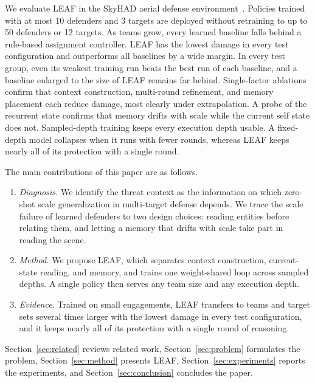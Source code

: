 We evaluate LEAF in the SkyHAD aerial defense environment~\cite{skyhad2026}. Policies trained with at most 10 defenders and 3 targets are deployed without retraining to up to 50 defenders or 12 targets. As teams grow, every learned baseline falls behind a rule-based assignment controller. LEAF has the lowest damage in every test configuration and outperforms all baselines by a wide margin. In every test group, even its weakest training run beats the best run of each baseline, and a baseline enlarged to the size of LEAF remains far behind. Single-factor ablations confirm that context construction, multi-round refinement, and memory placement each reduce damage, most clearly under extrapolation. A probe of the recurrent state confirms that memory drifts with scale while the current self state does not. Sampled-depth training keeps every execution depth usable. A fixed-depth model collapses when it runs with fewer rounds, whereas LEAF keeps nearly all of its protection with a single round.

The main contributions of this paper are as follows.
\begin{enumerate}
\item \emph{Diagnosis.} We identify the threat context as the information on which zero-shot scale generalization in multi-target defense depends. We trace the scale failure of learned defenders to two design choices: reading entities before relating them, and letting a memory that drifts with scale take part in reading the scene.
\item \emph{Method.} We propose LEAF, which separates context construction, current-state reading, and memory, and trains one weight-shared loop across sampled depths. A single policy then serves any team size and any execution depth.
\item \emph{Evidence.} Trained on small engagements, LEAF transfers to teams and target sets several times larger with the lowest damage in every test configuration, and it keeps nearly all of its protection with a single round of reasoning.
\end{enumerate}

Section~\ref{sec:related} reviews related work, Section~\ref{sec:problem} formulates the problem, Section~\ref{sec:method} presents LEAF, Section~\ref{sec:experiments} reports the experiments, and Section~\ref{sec:conclusion} concludes the paper.

